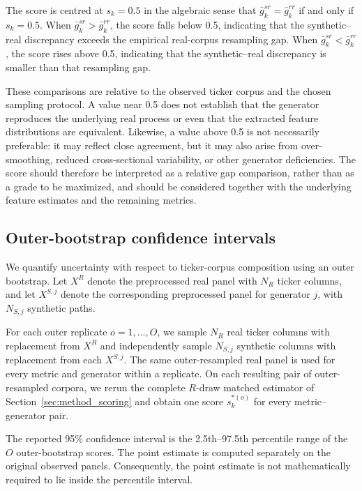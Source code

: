 The score is centred at $s_k=0.5$ in the algebraic sense that
$\bar g_k^{sr}=\bar g_k^{rr}$ if and only if $s_k=0.5$.
When $\bar g_k^{sr}>\bar g_k^{rr}$, the score falls below 0.5, indicating
that the synthetic--real discrepancy exceeds the empirical real-corpus
resampling gap.
When $\bar g_k^{sr}<\bar g_k^{rr}$, the score rises above 0.5, indicating
that the synthetic--real discrepancy is smaller than that resampling gap.

These comparisons are relative to the observed ticker corpus and the chosen
sampling protocol.
A value near 0.5 does not establish that the generator reproduces the
underlying real process or even that the extracted feature distributions are
equivalent.
Likewise, a value above 0.5 is not necessarily preferable: it may reflect
close agreement, but it may also arise from over-smoothing, reduced
cross-sectional variability, or other generator deficiencies.
The score should therefore be interpreted as a relative gap comparison,
rather than as a grade to be maximized, and should be considered together
with the underlying feature estimates and the remaining metrics.

\subsection{Outer-bootstrap confidence intervals}\label{sec:method_ci}

We quantify uncertainty with respect to ticker-corpus composition using an outer bootstrap. Let $X^R$ denote the preprocessed real panel with $N_R$ ticker columns, and let $X^{S,j}$ denote the corresponding preprocessed panel for generator $j$, with $N_{S,j}$ synthetic paths.

For each outer replicate $o=1,\ldots,O$, we sample $N_R$ real ticker columns with replacement from $X^R$ and independently sample $N_{S,j}$ synthetic columns with replacement from each $X^{S,j}$.
The same outer-resampled real panel is used for every metric and generator within a replicate.
On each resulting pair of outer-resampled corpora, we rerun the complete $R$-draw matched estimator of Section~\ref{sec:method_scoring} and obtain one score $s_k^{*(o)}$ for every metric–generator pair.

The reported 95\% confidence interval is the 2.5th–97.5th percentile range of the $O$ outer-bootstrap scores. The point estimate is computed separately on the original observed panels. Consequently, the point estimate is not mathematically required to lie inside the percentile interval.

